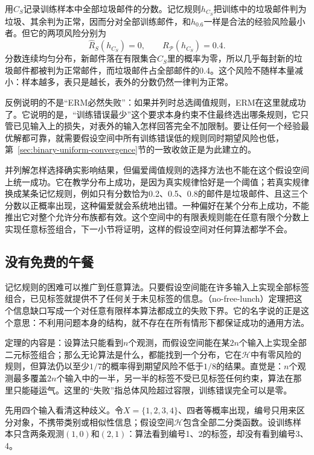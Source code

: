 用$C_S$记录训练样本中全部垃圾邮件的分数。记忆规则$h_{C_S}$把训练中的垃圾邮件判为垃圾、其余判为正常，因而分对全部训练邮件，和$h_{0.6}$一样是合法的经验风险最小者。但它的两项风险分别为
\begin{equation}
  \hat R_S(h_{C_S})=0,
  \qquad
  R_{\mathcal P}(h_{C_S})=0.4.
  \label{eq:memorization-erm-failure}
\end{equation}
分数连续均匀分布，新邮件落在有限集合$C_S$里的概率为零，所以几乎每封新的垃圾邮件都被判为正常邮件，而垃圾邮件占全部邮件的0.4。这个风险不随样本量减小：样本越多，表只是越长，表外的分数仍然一律判为正常。

反例说明的不是“ERM必然失败”：如果并列时总选阈值规则，ERM在这里就成功了。它说明的是，“训练错误最少”这个要求本身约束不住最终选出哪条规则，它只管已见输入上的损失，对表外的输入怎样回答完全不加限制。要让任何一个经验最优解都可靠，就需要假设空间中所有训练错误低的规则同时期望风险也低，第~\ref{sec:binary-uniform-convergence}节的一致收敛正是为此建立的。

并列解怎样选择确实影响结果，但偏爱阈值规则的选择方法也不能在这个假设空间上统一成功。它在教学分布上成功，是因为真实规律恰好是一个阈值；若真实规律换成某条记忆规则，例如只有分数恰为0.2、0.5、0.8的邮件是垃圾邮件、且这三个分数以正概率出现，这种偏爱就会系统地出错。一种偏好在某个分布上成功，不能推出它对整个允许分布族都有效。这个空间中的有限表规则能在任意有限个分数上实现任意标签组合，下一小节将证明，这样的假设空间对任何算法都学不会。

\subsection{没有免费的午餐}
\label{sec:no-free-lunch}

记忆规则的困难可以推广到任意算法。只要假设空间能在许多输入上实现全部标签组合，已见标签就提供不了任何关于未见标签的信息。（no-free-lunch）定理把这个信息缺口写成一个对任意有限样本算法都成立的失败下界。它的名字说的正是这个意思：不利用问题本身的结构，就不存在在所有情形下都保证成功的通用方法。

定理的内容是：设算法只能看到$n$个观测，而假设空间能在某$2n$个输入上实现全部二元标签组合；那么无论算法是什么，都能找到一个分布，它在$\mathcal H$中有零风险的规则，但算法仍以至少$1/7$的概率得到期望风险不低于$1/8$的结果。直觉是：$n$个观测最多覆盖$2n$个输入中的一半，另一半的标签不受已见标签任何约束，算法在那里只能碰运气。这里的“失败”指总体风险超过容限，训练错误完全可以是零。

先用四个输入看清这种歧义。令$X=\{1,2,3,4\}$、四者等概率出现，编号只用来区分对象，不携带类别或相似性信息；假设空间$\mathcal H$包含全部二分类函数。设训练样本只含两条观测$(1,0)$和$(2,1)$：算法看到编号1、2的标签，却没有看到编号3、4。

